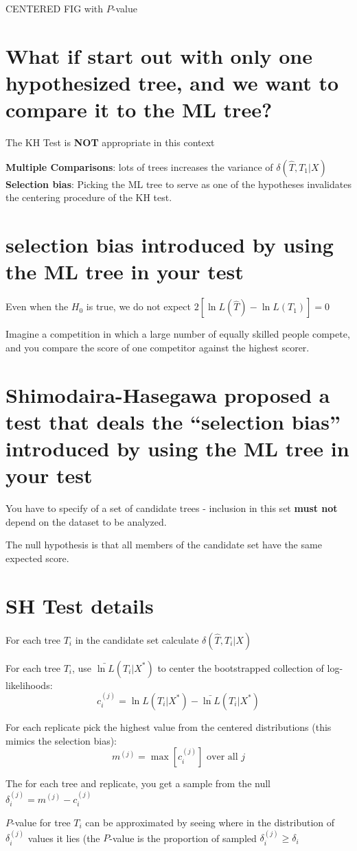 \documentclass[landscape]{foils}
\begin{document}
\myNewSlide
CENTERED FIG with $P$-value


\myNewSlide
\section*{What if start out with only one hypothesized tree, and we want to compare it to the ML tree?}
The KH Test is {\bf NOT} appropriate in this context \citep[see][for discussion of this point]{GoldmanAR2000}

{\bf Multiple Comparisons}: lots of trees increases the variance of $\delta(\hat{T},T_1|X)$\\

{\bf Selection bias}: Picking the ML tree to serve as one of the hypotheses invalidates the centering procedure of the KH test.

\myNewSlide
\section*{selection bias introduced by using the ML tree in your test}
Even when the $H_0$ is true, we do not expect $2\left[\ln L(\hat{T}) - \ln L(T_1)\right]= 0$

Imagine a competition in which a large number of equally skilled people compete, and you compare the score of one competitor against the highest scorer.

\myNewSlide
\section*{Shimodaira-Hasegawa proposed a test that deals the ``selection bias'' introduced by using the ML tree in your test}
You have to specify of a set of candidate trees - inclusion in this set {\bf must not} depend on the dataset to be analyzed.

The null hypothesis is that all members of the candidate set have the same expected score.

\myNewSlide
\section*{SH Test details}
\normalsize
\begin{compactitem}
	\item For each tree $T_i$ in the candidate set calculate $\delta(\hat{T}, T_i|X)$
	\item For each tree $T_i$, use $\bar{\ln L}(T_i|X^{\ast})$ to center the bootstrapped collection of log-likelihoods:
		$$c_i^{(j)} = {\ln L}(T_i|X^{\ast})-\bar{\ln L}(T_i|X^{\ast})$$
	\item For each replicate pick the highest value from the centered distributions (this mimics the selection bias): $$m^{(j)} = \max\left[c_i^{(j)}\right] \mbox{ over all } j$$
	\item The for each tree and replicate, you get a sample from the null $\delta_i^{(j)} = m^{(j)} - c_i^{(j)}$
	\item $P$-value for tree $T_i$ can be approximated by seeing where in the distribution of $\delta_i^{(j)}$ values it lies (the $P$-value is the proportion of sampled $\delta_i^{(j)} \geq \delta_i$
\end{compactitem}
\end{document}
